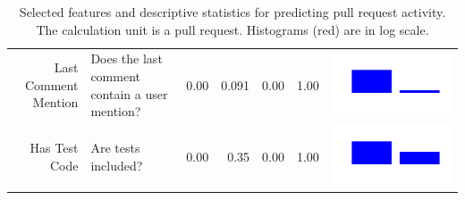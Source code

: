 \documentclass[conference]{IEEEtran}
\begin{document}
\begin{table}[ht]
\begin{tabular}{rp{26em}rrrrc}
    Last Comment Mention & Does the last comment contain a user mention? & 0.00 & 0.091 & 0.00 & 1.00 & \includegraphics[scale = 0.1, clip = true, trim= 50px 60px 50px 60px]{../figs/hist-features/hist-lastCommentMention.pdf} \\
    Has Test Code & Are tests included? & 0.00 & 0.35 & 0.00 & 1.00 & \includegraphics[scale = 0.09, clip = true, trim= 50px 60px 50px 60px]{../figs/hist-features/hist-hasTestCode.pdf} \\
    \hline
  \end{tabular}
  \caption{Selected features and descriptive statistics for predicting pull
  request activity. The calculation unit is a pull request.
  Histograms (red) are in log scale.}
  \label{tab:features}
  \vspace{-6mm}
\end{table}
\end{document}
